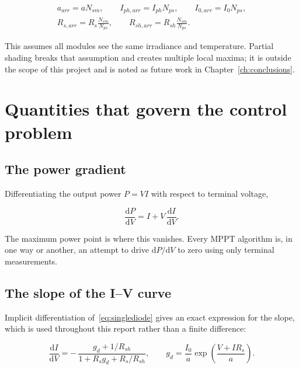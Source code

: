 \begin{equation}
\begin{gathered}
a_{arr} = a N_{sm}, \qquad
I_{ph,arr} = I_{ph} N_{ps}, \qquad
I_{0,arr} = I_0 N_{ps},\\[4pt]
R_{s,arr} = R_s \frac{N_{sm}}{N_{ps}}, \qquad
R_{sh,arr} = R_{sh} \frac{N_{sm}}{N_{ps}} .
\end{gathered}
\label{eq:arrayscaling}
\end{equation}

This assumes all modules see the same irradiance and temperature. Partial
shading breaks that assumption and creates multiple local maxima; it is outside
the scope of this project and is noted as future work in
Chapter~\ref{ch:conclusions}.

\section{Quantities that govern the control problem}

\subsection{The power gradient}

Differentiating the output power $P = V I$ with respect to terminal voltage,

\begin{equation}
\frac{\mathrm{d}P}{\mathrm{d}V} = I + V\,\frac{\mathrm{d}I}{\mathrm{d}V} .
\label{eq:dpdv}
\end{equation}

The maximum power point is where this vanishes. Every MPPT algorithm is, in one
way or another, an attempt to drive $\mathrm{d}P/\mathrm{d}V$ to zero using only
terminal measurements.

\subsection{The slope of the I--V curve}

Implicit differentiation of~\eqref{eq:singlediode} gives an exact expression for
the slope, which is used throughout this report rather than a finite difference:

\begin{equation}
\frac{\mathrm{d}I}{\mathrm{d}V}
= -\,\frac{g_d + 1/R_{sh}}{1 + R_s g_d + R_s/R_{sh}},
\qquad
g_d = \frac{I_0}{a}\exp\!\left(\frac{V + I R_s}{a}\right).
\label{eq:didv}
\end{equation}

